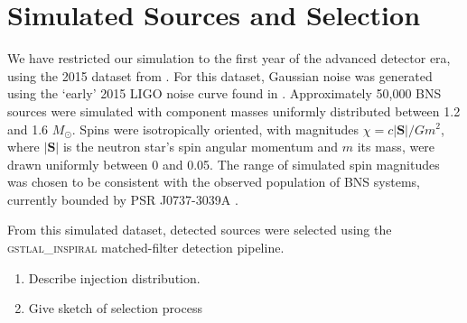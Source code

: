 \section{Simulated Sources and Selection}

We have restricted our simulation to the first year of the advanced detector era, using the 2015 dataset from \cite{Singer_2014}.  For this dataset, Gaussian noise was generated using the `early' 2015 LIGO noise curve found in \cite{Barsotti:2012}.  Approximately 50,000 BNS sources were simulated with component masses uniformly distributed between 1.2 and 1.6 $M_\odot$.  Spins were isotropically oriented, with magnitudes $\chi = c |\mathbf{S}|/G m^2$, where $|\mathbf{S}|$ is the neutron star's spin angular momentum and $m$ its mass, were drawn uniformly between 0 and 0.05.  The range of simulated spin magnitudes was chosen to be consistent with the observed population of BNS systems, currently bounded by PSR J0737-3039A \cite{Burgay_2003,Brown_2012}.

From this simulated dataset, detected sources were selected using the \textsc{gstlal\_inspiral} matched-filter detection pipeline\cite{Cannon_2012}. 

\begin{enumerate}
\item Describe injection distribution.
\item Give sketch of selection process
\end{enumerate}